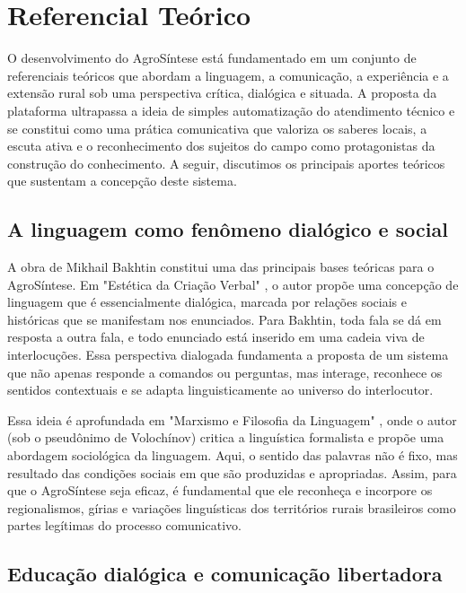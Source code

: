 \chapter{Referencial Teórico}

O desenvolvimento do AgroSíntese está fundamentado em um conjunto de referenciais teóricos que abordam a linguagem, a comunicação, a experiência e a extensão rural sob uma perspectiva crítica, dialógica e situada. A proposta da plataforma ultrapassa a ideia de simples automatização do atendimento técnico e se constitui como uma prática comunicativa que valoriza os saberes locais, a escuta ativa e o reconhecimento dos sujeitos do campo como protagonistas da construção do conhecimento. A seguir, discutimos os principais aportes teóricos que sustentam a concepção deste sistema.

\section{A linguagem como fenômeno dialógico e social}

A obra de Mikhail Bakhtin constitui uma das principais bases teóricas para o AgroSíntese. Em "Estética da Criação Verbal" \cite{bakhtin1997estetica}, o autor propõe uma concepção de linguagem que é essencialmente dialógica, marcada por relações sociais e históricas que se manifestam nos enunciados. Para Bakhtin, toda fala se dá em resposta a outra fala, e todo enunciado está inserido em uma cadeia viva de interlocuções. Essa perspectiva dialogada fundamenta a proposta de um sistema que não apenas responde a comandos ou perguntas, mas interage, reconhece os sentidos contextuais e se adapta linguisticamente ao universo do interlocutor.

Essa ideia é aprofundada em "Marxismo e Filosofia da Linguagem" \cite{bakhtin1981marxismo}, onde o autor (sob o pseudônimo de Volochínov) critica a linguística formalista e propõe uma abordagem sociológica da linguagem. Aqui, o sentido das palavras não é fixo, mas resultado das condições sociais em que são produzidas e apropriadas. Assim, para que o AgroSíntese seja eficaz, é fundamental que ele reconheça e incorpore os regionalismos, gírias e variações linguísticas dos territórios rurais brasileiros como partes legítimas do processo comunicativo.

\section{Educação dialógica e comunicação libertadora}

